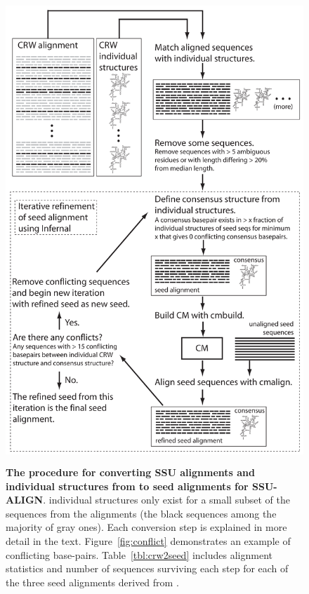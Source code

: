 \begin{figure}
  \begin{center}
\includegraphics[height=6.9in]{Figures/crw2seed-schematic}
        \caption[The procedure for converting SSU alignments and
          individual structures from  to seed alignments for
          SSU-ALIGN.]  {\textbf{The procedure for converting
            SSU alignments and individual structures from  to seed
            alignments for SSU-ALIGN}.  individual structures
          only exist for a small subset of the sequences from the 
          alignments (the black sequences among the majority of gray
          ones). Each conversion step is explained
          in more detail in the text. 
          Figure~\ref{fig:conflict}
          demonstrates an example of conflicting base-pairs. 
          Table~\ref{tbl:crw2seed} includes alignment
          statistics and number of sequences surviving each step for
          each of the three seed alignments derived from .}
  \end{center}
\label{fig:crw2seed}
\end{figure}

